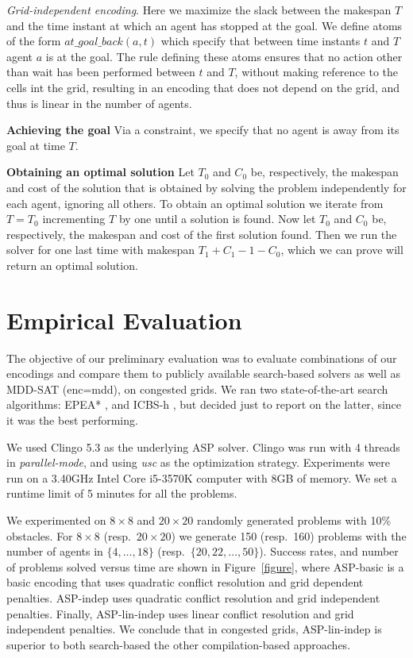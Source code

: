 \documentclass[letterpaper]{article} %
\begin{document}
\noindent \emph{Grid-independent encoding}. Here we maximize the slack between the makespan $T$ and the time instant at which an agent has stopped at the goal. We define atoms of the form $at\_goal\_back(a,t)$ which specify that between time instants $t$ and $T$ agent $a$ is at the goal. The rule defining these atoms ensures that no action other than wait has been performed between $t$ and $T$, without making reference to the cells int the grid, resulting in an encoding that does not depend on the grid, and thus is linear in the number of agents.

\noindent \textbf{Achieving the goal} Via a constraint, we specify that no agent is away from its goal at time $T$.

\noindent \textbf{Obtaining an optimal solution} Let $T_0$ and $C_0$ be, respectively, the makespan and cost of the solution that is obtained by solving the problem independently for each agent, ignoring all others. To obtain an optimal solution we iterate from $T=T_0$ incrementing $T$ by one until a solution is found. Now let $T_0$ and $C_0$ be, respectively, the makespan and cost of the first solution found. Then we run the solver for one last time with makespan $T_1+C_1-1-C_0$, which we can prove will return an optimal solution.

%
%


\section{Empirical Evaluation}
The objective of our preliminary evaluation was to evaluate combinations of our encodings and compare them to publicly available search-based solvers as well as MDD-SAT \cite{Surynek14} (enc=mdd), on congested grids. We ran two state-of-the-art search algorithms:  EPEA* \cite{Goldenberg14}, and ICBS-h \cite{FelnerLB00KK18}, but decided just to report on the latter, since it was the best performing.

We used Clingo 5.3 as the underlying ASP solver. Clingo was run with 4 threads in \textit{parallel-mode}, and using \textit{usc} as the optimization strategy. 
Experiments were run on a 3.40GHz Intel Core i5-3570K computer with 8GB of memory. We set a runtime limit of 5 minutes for all the problems.

We experimented on $8\times 8$ and $20\times 20$ randomly generated problems with 10\% obstacles. For $8\times8$ (resp.~$20\times 20$) we generate 150 (resp.~160) problems with the number of agents in $\{4,\dots,18\}$ (resp.~$\{20,22,\ldots,50\}$). Success rates, and number of problems solved versus time are shown in Figure~\ref{figure}, where ASP-basic is a basic encoding that uses quadratic conflict resolution and grid dependent penalties. ASP-indep uses quadratic conflict resolution and grid independent penalties. Finally, ASP-lin-indep uses linear conflict resolution and grid independent penalties. We conclude that in congested grids, ASP-lin-indep is superior to both search-based the other compilation-based approaches. 
%
%

\footnotesize


\end{document}
